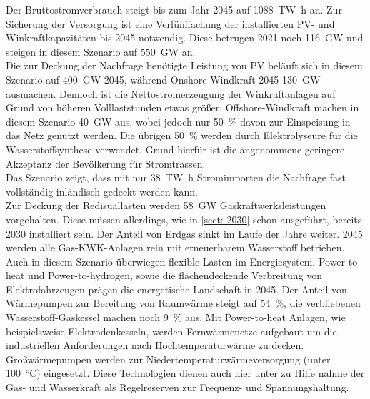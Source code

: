 		Der Bruttostromverbrauch steigt bis zum Jahr 2045 auf \SI{1088}{\tera \watt \hour} an. Zur Sicherung der Versorgung ist eine Verfünffachung der installierten PV- und Winkraftkapazitäten bis 2045 notwendig. Diese betrugen 2021 noch \SI{116}{\giga \watt} und steigen in diesem Szenario auf \SI{550}{\giga \watt} an.\\
		Die zur Deckung der Nachfrage benötigte Leistung von PV beläuft sich in diesem Szenario auf \SI{400}{\giga \watt} 2045, während Onshore-Windkraft 2045 \SI{130}{\giga \watt} ausmachen. Dennoch ist die Nettostromerzeugung der Winkraftanlagen auf Grund von höheren Volllaststunden etwas größer. Offshore-Windkraft machen in diesem Szenario \SI{40}{\giga \watt} aus, wobei jedoch nur \SI{50}{\percent} davon zur Einspeisung in das Netz genutzt werden. Die übrigen \SI{50}{\percent} werden durch Elektrolyseure für die Wasserstoffsynthese verwendet. Grund hierfür ist die angenommene geringere Akzeptanz der Bevölkerung für Stromtrassen.\\
		Das Szenario zeigt, dass mit nur \SI{38}{\tera \watt \hour} Stromimporten die Nachfrage fast vollständig inländisch gedeckt werden kann.\\
		
		Zur Deckung der Redisuallasten werden \SI{58}{\giga \watt} Gaskraftwerksleistungen vorgehalten. Diese müssen allerdings, wie in \ref{sect: 2030} schon ausgeführt, bereits 2030 installiert sein. Der Anteil von Erdgas sinkt im Laufe der Jahre weiter. 2045 werden alle Gas-KWK-Anlagen rein mit erneuerbarem Wasserstoff betrieben.\\
		
		Auch in diesem Szenario überwiegen flexible Lasten im Energiesystem. Power-to-heat und Power-to-hydrogen, sowie die flächendeckende Verbreitung von Elektrofahrzeugen prägen die energetische Landschaft in 2045. Der Anteil von Wärmepumpen zur Bereitung von Raumwärme steigt auf \SI{54}{\percent}, die verbliebenen Wasserstoff-Gaskessel machen noch \SI{9}{\percent} aus. Mit Power-to-heat Anlagen, wie beispielsweise Elektrodenkesseln, werden Fernwärmenetze aufgebaut um die industriellen Anforderungen nach Hochtemperaturwärme zu decken. Großwärmepumpen werden zur Niedertemperaturwärmeversorgung (unter \SI{100}{\degreeCelsius}) eingesetzt. Diese Technologien dienen auch hier unter zu Hilfe nahme der Gas- und Wasserkraft als Regelreserven zur Frequenz- und Spannungshaltung.\\
		
